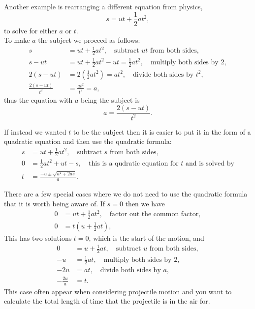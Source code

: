 \begin{ex}
Another example is rearranging a different equation from physics,
\begin{equation*}
s=ut+\frac{1}{2}at^{2},
\end{equation*}
to solve for either $a$ or $t$.\\

To make $a$ the subject we proceed as follows:
\begin{align*}
s&=ut+\frac{1}{2}at^{2}, \quad \text{subtract $ut$ from both sides},\\
s-ut&=ut+\frac{1}{2}at^{2}-ut=\frac{1}{2}at^{2}, \quad \text{multiply both sides by $2$},\\
2\left(s-ut\right)&=2\left(\frac{1}{2}at^{2}\right)=at^{2}, \quad \text{divide both sides by $t^{2}$},\\
\frac{2\left(s-ut\right)}{t^{2}}&=\frac{at^{2}}{t^{2}}=a,
\end{align*}
thus the equation with $a$ being the subject is 
\begin{equation*}
a=\frac{2\left(s-ut\right)}{t^{2}}.
\end{equation*}

If instead we wanted $t$ to be the subject then it is easier to put it in the form of a quadratic equation and then use the quadratic formula:
\begin{align*}
s&=ut+\frac{1}{2}at^{2}, \quad \text{subtract $s$ from both sides},\\
0&=\frac{1}{2}at^{2}+ut-s,\quad \text{this is a qudratic equation for $t$ and is solved by}\\
t&=\frac{-u\pm\sqrt{u^{2}+2as}}{a}.
\end{align*}
\end{ex}

There are a few special cases where we do not need to use the quadratic formula that it is worth being aware of. If $s=0$ then we have
\begin{align*}
0&=ut+\frac{1}{2}at^{2}, \quad \text{factor out the common factor},\\
0&=t\left(u+\frac{1}{2}at\right),
\end{align*}
This has two solutions $t=0$, which is the start of the motion, and
\begin{align*}
0&=u+\frac{1}{2}at, \quad \text{subtract $u$ from both sides},\\
-u&=\frac{1}{2}at, \quad \text{multiply both sides by $2$},\\
-2u&=at, \quad \text{divide both sides by $a$},\\
-\frac{2u}{a}&=t.
\end{align*}
This case often appear when considering projectile motion and you want to calculate the total length of time that the projectile is in the air for.\\

